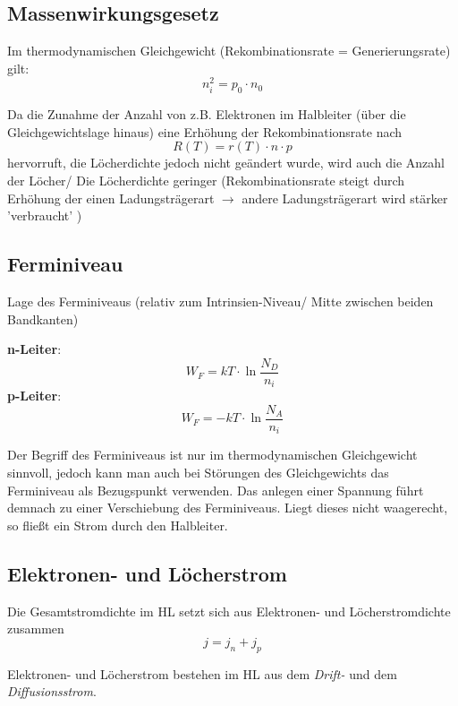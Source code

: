 \documentclass[a4paper, 12pt]{article}
\begin{document}
\subsection*{Massenwirkungsgesetz}

Im thermodynamischen Gleichgewicht (Rekombinationsrate = Generierungsrate) gilt:
$$ n_i^2 = p_0 \cdot n_0  $$

Da die Zunahme der Anzahl von z.B. Elektronen im Halbleiter (über die
Gleichgewichtslage hinaus) eine Erhöhung der Rekombinationsrate nach
\[ R(T) = r(T) \cdot n \cdot p\]
hervorruft, die Löcherdichte jedoch nicht geändert wurde, wird auch die Anzahl
der Löcher/ Die Löcherdichte geringer (Rekombinationsrate steigt durch Erhöhung der einen
Ladungsträgerart $\rightarrow$ andere Ladungsträgerart wird stärker 'verbraucht' )


\subsection*{Ferminiveau}

Lage des Ferminiveaus (relativ zum Intrinsien-Niveau/ Mitte zwischen beiden Bandkanten)

\noindent \textbf{n-Leiter}:
\[ W_F = kT\cdot \ln{\frac{N_D}{n_i}}\]
\textbf{p-Leiter}:
\[ W_F = -kT\cdot \ln{\frac{N_A}{n_i}}\]


Der Begriff des Ferminiveaus ist nur im thermodynamischen Gleichgewicht
sinnvoll, jedoch kann man auch bei Störungen des Gleichgewichts das Ferminiveau
als Bezugspunkt verwenden. Das anlegen einer Spannung führt demnach zu einer
Verschiebung des Ferminiveaus. Liegt dieses nicht waagerecht, so fließt ein Strom
durch den Halbleiter.

\subsection*{Elektronen- und Löcherstrom}

Die Gesamtstromdichte im HL setzt sich aus Elektronen- und Löcherstromdichte
zusammen
\[ j = j_n + j_p \]

Elektronen- und Löcherstrom bestehen im HL aus dem \emph{Drift-} und dem
\emph{Diffusionsstrom}.\\
\end{document}

